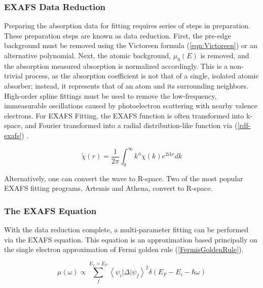 \subsubsection{EXAFS Data Reduction}
Preparing the absorption data for fitting requires series of steps in preparation. These preparation steps are known as data reduction. First, the pre-edge background must be removed using the Victoreen formula (\ref{eqn:Victoreen}) or an alternative polynomial. Next, the atomic background, $ \mu_0(E) $  is removed, and the absorption measured absorption is normalized accordingly. This is a non-trivial process, as the absorption coefficient is not that of a single, isolated atomic absorber; instead, it represents that of an atom and its surrounding neighbors. High-order spline fittings must be used to remove the low-frequency, immeasurable oscillations caused by photoelectron scattering with nearby valence electrons. For EXAFS Fitting, the EXAFS function is often transformed into k-space, and Fourier transformed into a radial distribution-like function via (\ref{rdf-exafs}) \cite{exafsbook}.

\begin{equation}
    \label{rdf-exafs}
    \widetilde{\chi}(r) = \frac{1}{2\pi} \int_{0}^{\infty }  k^n \chi(k) e^{2ikr} dk
\end{equation}

Alternatively, one can convert the wave to R-space. Two of the most popular EXAFS fitting programs, Artemis and Athena, convert to R-space.

\subsubsection{The EXAFS Equation}
With the data reduction complete, a multi-parameter fitting can be performed via the {EXAFS} equation. This equation is an approximation based principally on the single electron approximation of Fermi golden rule (\ref{FermisGoldenRule}).

\begin{equation}
    \label{FermisGoldenRule}
    \mu(\omega) \varpropto  \sum_{f}^{E_f > E_F} \left\langle \psi_i \lvert \Delta \rvert \psi_f \right\rangle ^2 \delta (E_F - E_i - \hbar \omega)  
\end{equation}


